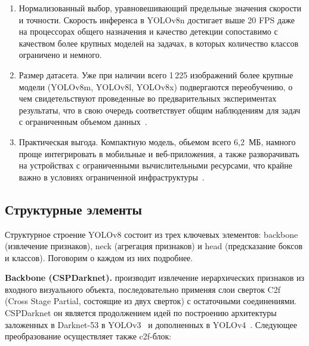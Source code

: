 \begin{enumerate}
\item Нормализованный выбор, уравновешивающий предельные значения скорости и точности. Скорость инференса в YOLOv8n достигает выше 20 FPS даже на процессорах общего назначения и качество детекции сопоставимо с качеством более крупных моделей на задачах, в которых количество классов ограничено и немного.
\item Размер датасета. Уже при наличии всего 1\,225 изображений более крупные модели (YOLOv8m, YOLOv8l, YOLOv8x) подвергаются переобучению, о чем свидетельствуют проведенные во предварительных экспериментах результаты, что в свою очередь соответствует общим наблюдениям для задач с ограниченным объемом данных~\cite{shorten2019augmentation}. \item Практическая выгода. Компактную модель, обьемом всего 6{,}2~МБ, намного проще интегрировать в мобильные и веб-приложения, а также разворачивать на устройствах с ограниченными вычислительными ресурсами, что крайне важно в условиях ограниченной инфраструктуры~\cite{vastai2023}. \end{enumerate}

\subsection{Структурные элементы}

Структурное строение YOLOv8 состоит из трех ключевых элементов: backbone (извлечение признаков), neck (агрегация признаков) и head (предсказание боксов и классов). Поговорим о каждом из них подробнее.

\textbf{Backbone (CSPDarknet). } производит извлечение иерархических признаков из входного визуального объекта, последовательно применяя слои сверток C2f (Cross Stage Partial, состоящие из двух сверток) с остаточными соединениями. CSPDarknet он является продолжением идей по построению архитектуры заложенных в Darknet-53 в YOLOv3~\cite{redmon2018yolov3} и дополненных в YOLOv4~\cite{bochkovskiy2020yolov4}. Следующее преобразование осуществляет также c2f-блок:

